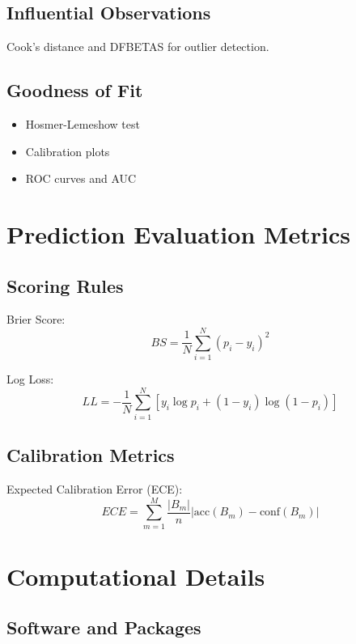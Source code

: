 \subsection{Influential Observations}

Cook's distance and DFBETAS for outlier detection.

\subsection{Goodness of Fit}

\begin{itemize}
\item Hosmer-Lemeshow test
\item Calibration plots
\item ROC curves and AUC
\end{itemize}

\section{Prediction Evaluation Metrics}

\subsection{Scoring Rules}

Brier Score:
\begin{equation}
BS = \frac{1}{N} \sum_{i=1}^N (p_i - y_i)^2
\end{equation}

Log Loss:
\begin{equation}
LL = -\frac{1}{N} \sum_{i=1}^N [y_i \log p_i + (1-y_i) \log(1-p_i)]
\end{equation}

\subsection{Calibration Metrics}

Expected Calibration Error (ECE):
\begin{equation}
ECE = \sum_{m=1}^M \frac{|B_m|}{n} |\text{acc}(B_m) - \text{conf}(B_m)|
\end{equation}

\section{Computational Details}

\subsection{Software and Packages}

